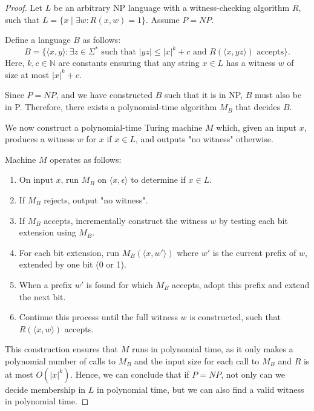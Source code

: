 \documentclass[a4paper,10pt]{article}
\begin{document}
\begin{proof}
Let \( L \) be an arbitrary NP language with a witness-checking algorithm \( R \), such that \( L = \{x \mid \exists w : R(x, w) = 1\} \). Assume \( P = NP \).

Define a language \( B \) as follows:
\[ B = \{\langle x, y \rangle : \exists z \in \Sigma^* \text{ such that } |yz| \leq |x|^k + c \text{ and } R(\langle x, yz \rangle) \text{ accepts} \}. \]
Here, \( k, c \in \mathbb{N} \) are constants ensuring that any string \( x \in L \) has a witness \( w \) of size at most \( |x|^k + c \).

Since \( P = NP \), and we have constructed \( B \) such that it is in NP, \( B \) must also be in P. Therefore, there exists a polynomial-time algorithm \( M_B \) that decides \( B \).

We now construct a polynomial-time Turing machine \( M \) which, given an input \( x \), produces a witness \( w \) for \( x \) if \( x \in L \), and outputs "no witness" otherwise. 

Machine \( M \) operates as follows:
\begin{enumerate}
    \item On input \( x \), run \( M_B \) on \( \langle x, \epsilon \rangle \) to determine if \( x \in L \).
    \item If \( M_B \) rejects, output "no witness".
    \item If \( M_B \) accepts, incrementally construct the witness \( w \) by testing each bit extension using \( M_B \).
    \item For each bit extension, run \( M_B(\langle x, w' \rangle) \) where \( w' \) is the current prefix of \( w \), extended by one bit (0 or 1).
    \item When a prefix \( w' \) is found for which \( M_B \) accepts, adopt this prefix and extend the next bit.
    \item Continue this process until the full witness \( w \) is constructed, such that \( R(\langle x, w \rangle) \) accepts.
\end{enumerate}

This construction ensures that \( M \) runs in polynomial time, as it only makes a polynomial number of calls to \( M_B \) and the input size for each call to \( M_B \) and \( R \) is at most \( O(|x|^k) \). Hence, we can conclude that if \( P = NP \), not only can we decide membership in \( L \) in polynomial time, but we can also find a valid witness in polynomial time.
\end{proof}
\end{document}
